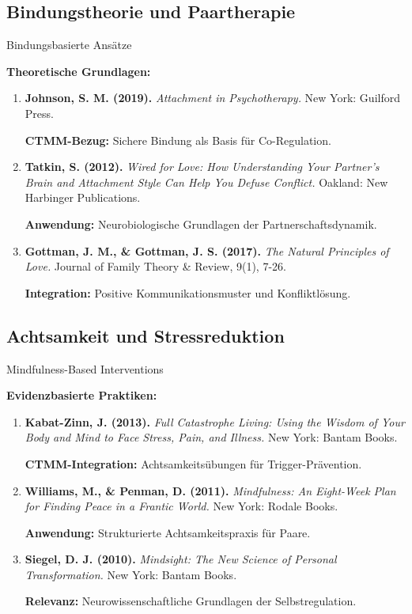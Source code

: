 \subsection{Bindungstheorie und Paartherapie}

\begin{ctmmBlueBox}{Bindungsbasierte Ansätze}

\textbf{Theoretische Grundlagen:}
\begin{enumerate}
  \item \textbf{Johnson, S. M. (2019).} \textit{Attachment in Psychotherapy.} New York: Guilford Press.

  \textbf{CTMM-Bezug:} Sichere Bindung als Basis für Co-Regulation.

  \item \textbf{Tatkin, S. (2012).} \textit{Wired for Love: How Understanding Your Partner's Brain and Attachment Style Can Help You Defuse Conflict.} Oakland: New Harbinger Publications.

  \textbf{Anwendung:} Neurobiologische Grundlagen der Partnerschaftsdynamik.

  \item \textbf{Gottman, J. M., \& Gottman, J. S. (2017).} \textit{The Natural Principles of Love.} Journal of Family Theory \& Review, 9(1), 7-26.

  \textbf{Integration:} Positive Kommunikationsmuster und Konfliktlösung.
\end{enumerate}

\end{ctmmBlueBox}

\subsection{Achtsamkeit und Stressreduktion}

\begin{ctmmGreenBox}{Mindfulness-Based Interventions}

\textbf{Evidenzbasierte Praktiken:}
\begin{enumerate}
  \item \textbf{Kabat-Zinn, J. (2013).} \textit{Full Catastrophe Living: Using the Wisdom of Your Body and Mind to Face Stress, Pain, and Illness.} New York: Bantam Books.

  \textbf{CTMM-Integration:} Achtsamkeitsübungen für Trigger-Prävention.

  \item \textbf{Williams, M., \& Penman, D. (2011).} \textit{Mindfulness: An Eight-Week Plan for Finding Peace in a Frantic World.} New York: Rodale Books.

  \textbf{Anwendung:} Strukturierte Achtsamkeitspraxis für Paare.

  \item \textbf{Siegel, D. J. (2010).} \textit{Mindsight: The New Science of Personal Transformation.} New York: Bantam Books.

  \textbf{Relevanz:} Neurowissenschaftliche Grundlagen der Selbstregulation.
\end{enumerate}

\end{ctmmGreenBox}

